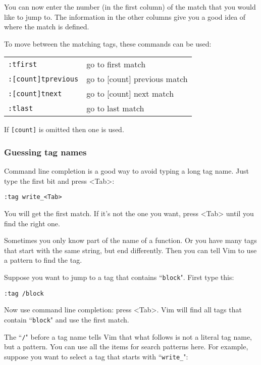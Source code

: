 You can now enter the number (in the first column) of the match that you would like to jump to.
The information in the other columns give you a good idea of where the match is defined.

To move between the matching tags, these commands can be used:

\begin{center} \begin{tabular}{l l}
				\texttt{:tfirst} & go to first match \\
				\texttt{:[count]tprevious} & go to [count] previous match \\
				\texttt{:[count]tnext} & go to [count] next match \\
				\texttt{:tlast} & go to last match \\
\end{tabular} \end{center}

If \texttt{[count]} is omitted then one is used.
\subsubsection{Guessing tag names}
Command line completion is a good way to avoid typing a long tag name.
Just type the first bit and press <Tab>:

\begin{Verbatim}[samepage=true]
 :tag write_<Tab>
\end{Verbatim}

You will get the first match.
If it's not the one you want, press <Tab> until you find the right one.

Sometimes you only know part of the name of a function.
Or you have many tags that start with the same string, but end differently.
Then you can tell Vim to use a pattern to find the tag.

Suppose you want to jump to a tag that contains ``\texttt{block}".
First type this:

\begin{Verbatim}[samepage=true]
 :tag /block
\end{Verbatim}

Now use command line completion: press <Tab>.
Vim will find all tags that contain ``\texttt{block}" and use the first match.

The ``\texttt{/}" before a tag name tells Vim that what follows is not a literal tag name, but a pattern.
You can use all the items for search patterns here.
For example, suppose you want to select a tag that starts with ``\texttt{write\_}":

